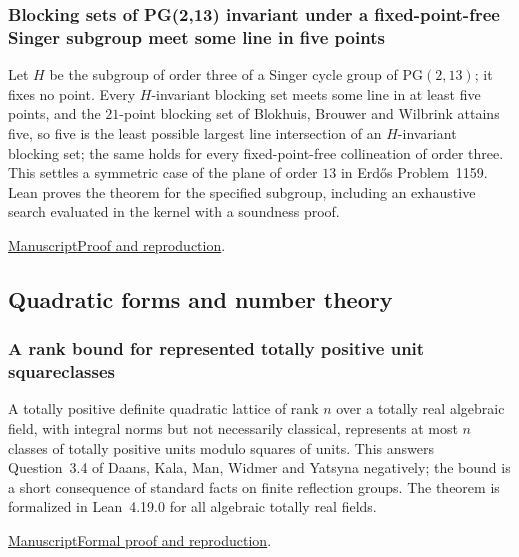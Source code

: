 \documentclass[11pt,a4paper]{article}
\begin{document}
\subsubsection{Blocking sets of PG(2,13) invariant under a fixed-point-free Singer subgroup meet some line in five points}

Let $H$ be the subgroup of order three of a Singer cycle group of $\mathrm{PG}(2,13)$; it fixes no point. Every $H$-invariant blocking set meets some line in at least five points, and the $21$-point blocking set of Blokhuis, Brouwer and Wilbrink attains five, so five is the least possible largest line intersection of an $H$-invariant blocking set; the same holds for every fixed-point-free collineation of order three. This settles a symmetric case of the plane of order $13$ in Erd\H{o}s Problem~1159. Lean proves the theorem for the specified subgroup, including an exhaustive search evaluated in the kernel with a soundness proof.

\noindent\href{https://github.com/dvgyl/math-and-theory/blob/main/papers/mathematics/singer-orbit-blocking/manuscript.pdf}{Manuscript}\quad\href{https://github.com/dvgyl/math-and-theory/blob/main/papers/mathematics/singer-orbit-blocking/README.md}{Proof and reproduction}.

\subsection{Quadratic forms and number theory}

\subsubsection{A rank bound for represented totally positive unit squareclasses}

A totally positive definite quadratic lattice of rank $n$ over a totally real algebraic field, with integral norms but not necessarily classical, represents at most $n$ classes of totally positive units modulo squares of units. This answers Question~3.4 of Daans, Kala, Man, Widmer and Yatsyna negatively; the bound is a short consequence of standard facts on finite reflection groups. The theorem is formalized in Lean~4.19.0 for all algebraic totally real fields.

\noindent\href{https://github.com/dvgyl/math-and-theory/blob/main/papers/mathematics/unit-squareclasses/manuscript.pdf}{Manuscript}\quad\href{https://github.com/dvgyl/math-and-theory/blob/main/papers/mathematics/unit-squareclasses/README.md}{Formal proof and reproduction}.
\end{document}
